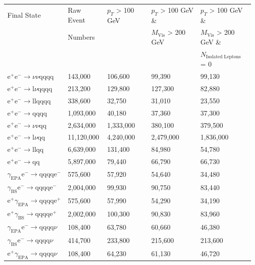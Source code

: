 \begin{table}[h!]
\centering
\begin{tabular}{ l l l l l}
\hline
Final State & Raw Event  & $p_{T}$ > 100 GeV & $p_{T}$ > 100 GeV \& & $p_{T}$ > 100 GeV \& \\ 
& Numbers & & $M_{\text{Vis}}$ > 200 GeV & $M_{\text{Vis}}$ > 200 GeV \&\\ 
& & & & $N_{\text{Isolated Leptons}}$ = 0\\ 
\hline
$\text{e}^{+}\text{e}^{-} \rightarrow \nu{\nu}\text{qqqq}$ & 143,000 & 106,600 & 99,390 & 99,130 \\ 
$\text{e}^{+}\text{e}^{-} \rightarrow \text{l}\nu\text{qqqq}$ & 213,200 & 129,800 & 127,300 & 82,880 \\
$\text{e}^{+}\text{e}^{-} \rightarrow \text{llqqqq}$ &338,600 & 32,750 & 31,010 & 23,550 \\
$\text{e}^{+}\text{e}^{-} \rightarrow \text{qqqq}$ & 1,093,000 & 40,180 & 37,360 & 37,300 \\ 
$\text{e}^{+}\text{e}^{-} \rightarrow \nu{\nu}\text{qq}$ & 2,634,000 & 1,333,000 & 380,100 & 379,500 \\
$\text{e}^{+}\text{e}^{-} \rightarrow \text{l}\nu\text{qq}$ & 11,120,000 & 4,240,000 & 2,479,000 & 1,836,000 \\
$\text{e}^{+}\text{e}^{-} \rightarrow \text{llqq}$ & 6,639,000 & 131,400 & 84,980 & 54,780 \\ 
$\text{e}^{+}\text{e}^{-} \rightarrow \text{qq}$ &5,897,000 & 79,440 & 66,790 & 66,730 \\
$\gamma_{\text{EPA}}\text{e}^{-} \rightarrow \text{qqqq}\text{e}^{-}$ & 575,600 & 57,920 & 54,640 & 34,480 \\ 
$\gamma_{\text{BS}}\text{e}^{-} \rightarrow \text{qqqq}\text{e}^{-}$ & 2,004,000 & 99,930 & 90,750 & 83,440 \\
$\text{e}^{+}\gamma_{\text{EPA}} \rightarrow \text{qqqq}\text{e}^{+}$ & 575,600 & 57,990 & 54,290 & 34,190 \\
$\text{e}^{+}\gamma_{\text{BS}} \rightarrow \text{qqqq}\text{e}^{+}$ & 2,002,000 & 100,300 & 90,830 & 83,960 \\   
$\gamma_{\text{EPA}}\text{e}^{-} \rightarrow \text{qqqq}\nu$ & 108,400 & 63,780 & 60,660 & 46,380 \\
$\gamma_{\text{BS}}\text{e}^{-} \rightarrow \text{qqqq}\nu$ & 414,700 & 233,800 & 215,600 & 213,600 \\
$\text{e}^{+}\gamma_{\text{EPA}} \rightarrow \text{qqqq}\nu$ & 108,400 & 64,230 & 61,130 & 46,720 \\ 

\end{tabular}
\end{table}
